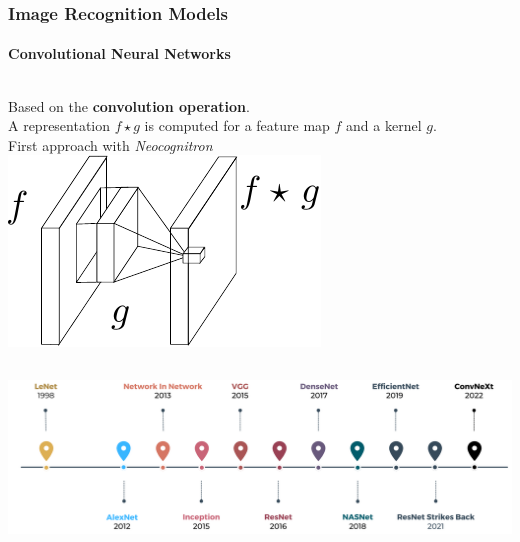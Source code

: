 \begin{frame}[t]
    \frametitle{Image Recognition Models}
    \framesubtitle{Convolutional Neural Networks}
    \begin{columns}
        {\footnotesize Based on the \textbf{convolution operation}.\\
         A representation $f\star g$ is computed for a feature map $f$ and a kernel $g$.\\
         First approach with \emph{Neocognitron}\cite{fukushima1975cognitron}}
            \includegraphics[scale=0.75]{fig/rel/imrecon/img/conv_schema.pdf}\pause
    \end{columns}
        \begin{center}
            \includegraphics[width=\textwidth]{fig/rel/imrecon/img/CNN_timeline.pdf}
        \end{center}
        
\end{frame}
